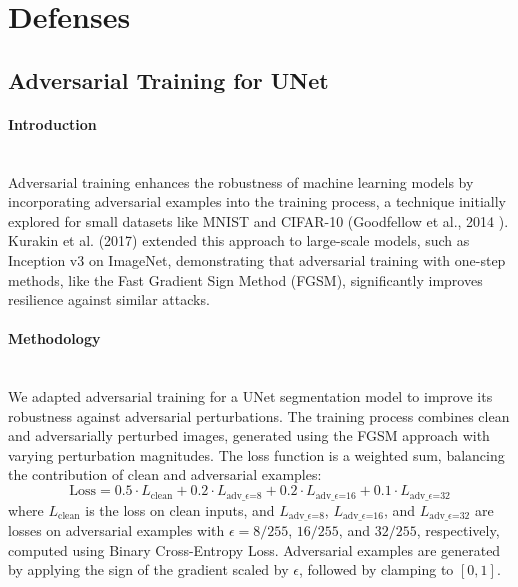 \documentclass[../main.tex]{subfiles}
\begin{document}
\section{Defenses}
\subsection{Adversarial Training for UNet}
\paragraph{Introduction}\leavevmode\\
Adversarial training enhances the robustness of machine learning models by incorporating adversarial examples into the training process, a technique initially explored for small datasets like MNIST and CIFAR-10 (Goodfellow et al., 2014 \cite{goodfellow2015explaining}). Kurakin et al. (2017) \cite{kurakin2017adversarialmachinelearningscale} extended this approach to large-scale models, such as Inception v3 on ImageNet, demonstrating that adversarial training with one-step methods, like the Fast Gradient Sign Method (FGSM), significantly improves resilience against similar attacks. 

\paragraph{Methodology}\leavevmode\\
We adapted adversarial training for a UNet segmentation model to improve its robustness against adversarial perturbations. The training process combines clean and adversarially perturbed images, generated using the FGSM approach with varying perturbation magnitudes. The loss function is a weighted sum, balancing the contribution of clean and adversarial examples:
\[
\text{Loss} = 0.5 \cdot L_{\text{clean}} + 0.2 \cdot L_{\text{adv_$\epsilon$=8}} + 0.2 \cdot L_{\text{adv_$\epsilon$=16}} + 0.1 \cdot L_{\text{adv_$\epsilon$=32}}
\]
where \(L_{\text{clean}}\) is the loss on clean inputs, and \(L_{\text{adv_$\epsilon$=8}}\), \(L_{\text{adv_$\epsilon$=16}}\), and \(L_{\text{adv_$\epsilon$=32}}\) are losses on adversarial examples with \(\epsilon = 8/255\), \(16/255\), and \(32/255\), respectively, computed using Binary Cross-Entropy Loss. Adversarial examples are generated by applying the sign of the gradient scaled by \(\epsilon\), followed by clamping to \([0, 1]\).
\end{document}
